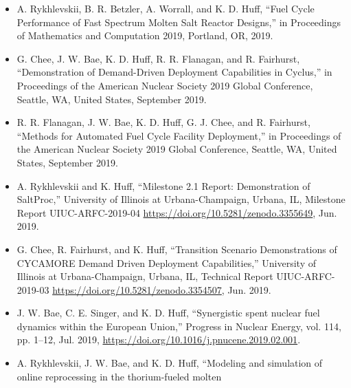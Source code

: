 \documentclass[letterpaper]{article}
\begin{document}
\begin{itemize}

               \item A. Rykhlevskii, B. R. Betzler, A. Worrall, and K. D. Huff, 
                       ``Fuel Cycle Performance of Fast Spectrum Molten Salt 
                       Reactor Designs,'' in Proceedings of Mathematics and 
                       Computation 2019, Portland, OR, 2019.
               \item G. Chee, J. W. Bae, K. D. Huff, R. R. Flanagan, and R. 
                       Fairhurst, ``Demonstration of Demand-Driven Deployment 
                       Capabilities in Cyclus,'' in Proceedings of the American 
                       Nuclear Society 2019 Global Conference, Seattle, WA, 
                       United States, September 2019.
               \item R. R. Flanagan, J. W. Bae, K. D. Huff, G. J. Chee, and R. 
                       Fairhurst, ``Methods for Automated Fuel Cycle Facility 
                       Deployment,'' in Proceedings of the American Nuclear 
                       Society 2019 Global Conference, Seattle, WA, United 
                       States, September 2019.
               \item A. Rykhlevskii and K. Huff, ``Milestone 2.1 Report: 
                       Demonstration of SaltProc,'' University of Illinois at 
                       Urbana-Champaign, Urbana, IL, Milestone Report 
                       UIUC-ARFC-2019-04 
                       \url{https://doi.org/10.5281/zenodo.3355649}, Jun. 
                       2019.
               \item G. Chee, R. Fairhurst, and K. Huff, ``Transition Scenario 
                       Demonstrations of CYCAMORE Demand Driven Deployment 
                       Capabilities,” University of Illinois at 
                       Urbana-Champaign, Urbana, IL, Technical Report 
                       UIUC-ARFC-2019-03 \url{https://doi.org/10.5281/zenodo.3354507}, Jun. 2019.  
              \item J. W. Bae, C. E. Singer, and K. D. Huff, ``Synergistic 
                      spent nuclear fuel dynamics within the European Union,'' 
                      Progress in Nuclear Energy, vol. 114, pp. 1–12, Jul. 
                      2019, \url{https://doi.org/10.1016/j.pnucene.2019.02.001}.
               \item A. Rykhlevskii, J. W. Bae, and K. D. Huff, ``Modeling and 
                simulation of online reprocessing in the thorium-fueled molten 

\end{itemize}
\end{document}
